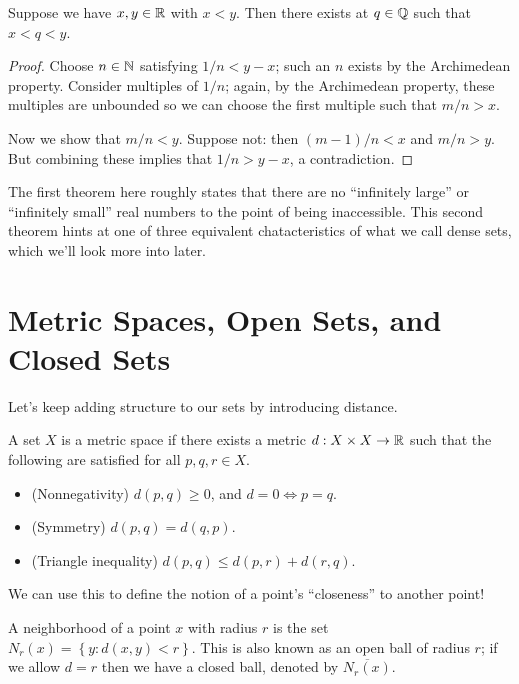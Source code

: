 \documentclass[../m131main.tex]{subfiles}
\begin{document}
\pagebreak

\begin{theorem}[$\Q$ is dense in $\R$]
    Suppose we have $x,y \in \mathbb{R}$ with $x < y$. Then there exists at $q \in \mathbb{Q}$ such that $x < q < y$.
\end{theorem}

\begin{proof}
    Choose $n \in \mathbb{N}$ satisfying $1 / n < y - x$; such an $n$ exists by the Archimedean property.
    Consider multiples of $1 / n$; again, by the Archimedean property, these multiples are unbounded so we can choose the first multiple such that $m / n > x$.

    Now we show that $m / n < y$.
    Suppose not: then $(m-1) / n < x$ and $m / n > y$.
    But combining these implies that $1 / n > y - x$, a contradiction.
\end{proof}

The first theorem here roughly states that there are no ``infinitely large'' or ``infinitely small'' real numbers to the point of being inaccessible.
This second theorem hints at one of three equivalent chatacteristics of what we call dense sets, which we'll look more into later.

\section{Metric Spaces, Open Sets, and Closed Sets}
Let's keep adding structure to our sets by introducing distance.

\begin{definition}
    A set $X$ is a metric space if there exists a metric $d : X \times X \to \mathbb{R}$ such that the following are satisfied for all $p,q,r \in X$.
    \begin{itemize}
        \item (Nonnegativity) $d(p,q) \geq 0$, and $d = 0 \iff p = q$.
        \item (Symmetry) $d(p,q) = d(q,p)$.
        \item (Triangle inequality) $d(p,q) \leq d(p,r) + d(r,q)$.
    \end{itemize}
\end{definition}

We can use this to define the notion of a point's ``closeness'' to another point!

\begin{definition}[Neighborhood]
    A neighborhood of a point $x$ with radius $r$ is the set $N_r(x) = \left\{ y : d(x,y) < r \right\}$.
    This is also known as an open ball of radius $r$; if we allow $d = r$ then we have a closed ball, denoted by $\overline{N_r(x)}$.
\end{definition}
\end{document}
